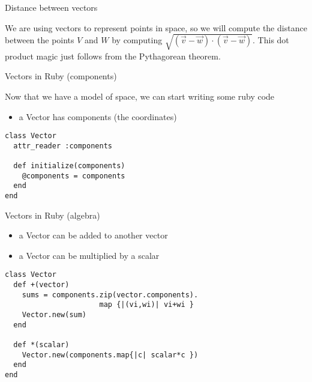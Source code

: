 \documentclass[bigger]{beamer}
\begin{document}
\begin{frame}[label=sec-15]{Distance between vectors}
\begin{block}{We are using vectors to represent points in space, so we will compute the distance between the points $V$ and $W$ by computing $\sqrt{(\vec{v}-\vec{w})\cdot (\vec{v}-\vec{w})}$. \alert{This dot product magic just follows from the Pythagorean theorem}.}
\begin{center}
\end{center}
\end{block}
\end{frame}

\begin{frame}[fragile,label=sec-16]{Vectors in Ruby (components)}
 \begin{block}{Now that we have a \alert{model of space}, we can start writing some ruby code}
\begin{itemize}
\item a Vector has components (the coordinates)
\end{itemize}
\begin{verbatim}
class Vector
  attr_reader :components

  def initialize(components)
    @components = components
  end
end
\end{verbatim}
\end{block}
\end{frame}

\begin{frame}[fragile,label=sec-17]{Vectors in Ruby (algebra)}
 \begin{itemize}
\item a Vector can be added to another vector
\item a Vector can be multiplied by a scalar
\end{itemize}
\begin{verbatim}
class Vector
  def +(vector)
    sums = components.zip(vector.components).
                      map {|(vi,wi)| vi+wi }
    Vector.new(sum)
  end

  def *(scalar)
    Vector.new(components.map{|c| scalar*c })
  end
end
\end{verbatim}
\end{frame}
\end{document}
